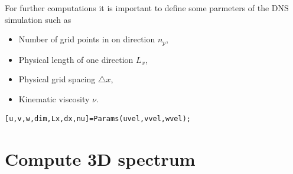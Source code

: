 \documentclass[preprint,12pt,ntfdMod]{elsarticle}
\begin{document}
\begin{par}

For further computations it is important to define some parmeters of the
DNS simulation such as
\begin{itemize}
  \item Number of grid points in on direction $n_{p}$,
  \item Physical length of one direction $L_x$,
  \item Physical grid spacing $\triangle x$,
  \item Kinematic viscosity $\nu$.
\end{itemize}

\end{par} \vspace{1em}
\begin{lstlisting}
[u,v,w,dim,Lx,dx,nu]=Params(uvel,vvel,wvel);
\end{lstlisting}
\begin{par}



\end{par} \vspace{1em}


\section{Compute 3D spectrum}
\end{document}
